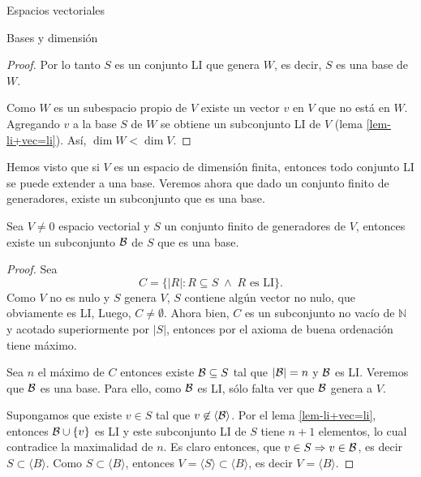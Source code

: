 \begin{chapter}{Espacios vectoriales}
\begin{section}{Bases y dimensi\'on}
\begin{proof}
        Por lo tanto $S$ es un conjunto LI  que genera $W$,  es decir, $S$  es una base de $W$. 
        
        Como $W$ es un subespacio propio de $V$ existe un vector $v$ en $V$ que
        no está en $W$. Agregando $v$ a la base $S$ de $W$ se obtiene un subconjunto
        LI de $V$ (lema \ref{lem-li+vec=li}). Así, $\dim W < \dim V$.
    \end{proof}

Hemos visto que si  $V$  es un espacio de dimensión finita,  entonces todo conjunto LI se puede extender a una base. Veremos ahora que dado un conjunto finito de generadores,  existe un subconjunto que es una base. 


\begin{teorema}\label{gen->base}
    Sea $V \ne 0$ espacio vectorial y $S$ un conjunto finito de generadores de $V$,  entonces existe un subconjunto $\mathcal{B}$  de $S$ que es una base.  
\end{teorema} 
\begin{proof}
    Sea
    $$
    C = \{|R|: R \subseteq S \;\wedge\; R \text{ es LI}\}.
    $$
    Como $V$ no es nulo  y $S$ genera $V$, $S$ contiene algún vector no nulo, que obviamente es LI, Luego, $C \ne \emptyset$. Ahora bien, $C$  es un subconjunto no vacío de  $\mathbb N$ y  acotado superiormente por $|S|$,  entonces por el axioma de buena ordenación tiene máximo. 
    
    Sea $n$ el máximo de $C$ entonces existe  $\mathcal{B} \subseteq S$ tal que $|\mathcal{B}| =n$  y $\mathcal{B}$ es LI. Veremos que $\mathcal{B}$  es una base. Para ello, como $\mathcal{B} $ es LI, sólo falta ver que $\mathcal{B}$ genera a $V$. 
    
    Supongamos que existe $v \in S$ tal que $ v \not\in \langle \mathcal{B} \rangle$. Por el lema \ref{lem-li+vec=li},  entonces  $\mathcal{B} \cup \{v\}$ es LI y este subconjunto LI de $S$ tiene $n+1$  elementos, lo cual contradice la maximalidad de $n$. Es claro entonces, que $v \in S \Rightarrow v \in \mathcal{B}$,  es decir $S \subset \langle B \rangle$. Como $S \subset \langle B \rangle$,  entonces
    $V = \langle S \rangle \subset \langle B \rangle$, es decir $V =  \langle B \rangle$.
\end{proof}



\end{section}
\end{chapter}
